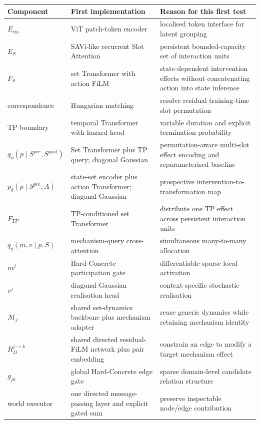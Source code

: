 \documentclass[11pt]{article}
\begin{document}
\begin{center}
\small
\begin{tabularx}{\textwidth}{@{}p{}p{}X@{}}
\toprule
Component & First implementation & Reason for this first test \\
\midrule
$E_{\mathrm{vis}}$ & ViT patch-token encoder & localised token interface for latent grouping \\
$E_S$ & SAVi-like recurrent Slot Attention & persistent bounded-capacity set of interaction units \\
$F_S$ & set Transformer with action FiLM & state-dependent intervention effects without concatenating action into state inference \\
correspondence & Hungarian matching & resolve residual training-time slot permutation \\
TP boundary & temporal Transformer with hazard head & variable duration and explicit termination probability \\
$q_\phi(p\mid S^{pre},S^{post})$ & Set Transformer plus TP query; diagonal Gaussian & permutation-aware multi-slot effect encoding and reparameterised baseline \\
$p_\theta(p\mid S^{pre},A)$ & state-set encoder plus action Transformer; diagonal Gaussian & prospective intervention-to-transformation map \\
$F_{TP}$ & TP-conditioned set Transformer & distribute one TP effect across persistent interaction units \\
$q_\eta(m,v\mid p,S)$ & mechanism-query cross-attention & simultaneous many-to-many allocation \\
$m^j$ & Hard-Concrete participation gate & differentiable sparse local activation \\
$v^j$ & diagonal-Gaussian realisation head & context-specific stochastic realisation \\
$\mathcal M_j$ & shared set-dynamics backbone plus mechanism adapter & reuse generic dynamics while retaining mechanism identity \\
$R_D^{j\rightarrow k}$ & shared directed residual-FiLM network plus pair embedding & constrain an edge to modify a target mechanism effect \\
$g_{jk}$ & global Hard-Concrete edge gate & sparse domain-level candidate relation structure \\
world executor & one directed message-passing layer and explicit gated sum & preserve inspectable node/edge contribution \\

\end{tabularx}
\end{center}
\end{document}

